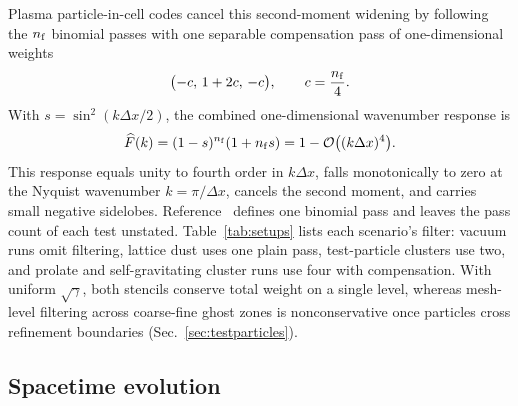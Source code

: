 Plasma particle-in-cell codes cancel this second-moment widening by following the $n_{\rm f}$ binomial passes with one separable compensation pass \cite{1991ppcs.book.....B} of one-dimensional weights
\begin{equation}\label{eq:comp_weights}
\bigl(-c,\, 1 + 2c,\, -c\bigr), \qquad c = \frac{n_{\rm f}}{4}.
\end{equation}
With $s = \sin^2(k\Delta x/2)$, the combined one-dimensional wavenumber response is
\begin{equation}\label{eq:comp_response}
\widehat{F}(k) = (1 - s)^{n_{\rm f}}(1 + n_{\rm f} s) = 1 - \mathcal{O}\bigl((k\Delta x)^4\bigr).
\end{equation}
This response equals unity to fourth order in $k\Delta x$, falls monotonically to zero at the Nyquist wavenumber $k = \pi/\Delta x$, cancels the second moment, and carries small negative sidelobes. Reference~\cite{Wu:2026nrpic} defines one binomial pass and leaves the pass count of each test unstated. Table~\ref{tab:setups} lists each scenario's filter: vacuum runs omit filtering, lattice dust uses one plain pass, test-particle clusters use two, and prolate and self-gravitating cluster runs use four with compensation. With uniform $\sqrt{\gamma}$, both stencils conserve total weight on a single level, whereas mesh-level filtering across coarse-fine ghost zones is nonconservative once particles cross refinement boundaries (Sec.~\ref{sec:testparticles}).

\subsection{Spacetime evolution}\label{sec:spacetime}

